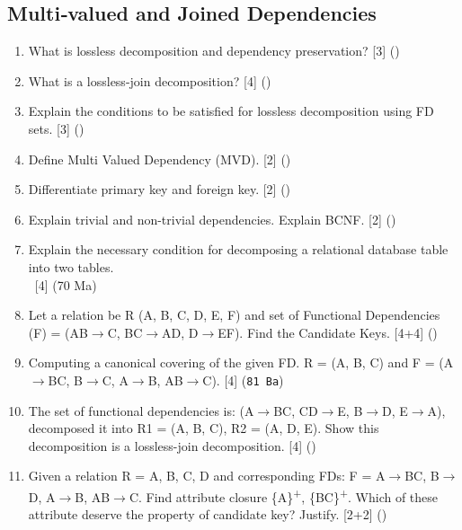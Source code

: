 \documentclass[12pt]{article}
\newcommand{\ra}{\rightarrow}
\newcommand{\enter}{\\\textcolor{white}{1}}
\newcommand{\super}[1]{\textsuperscript{#1}}
\begin{document}
    \subsection{Multi‐valued and Joined Dependencies}
    \begin{enumerate}[noitemsep, topsep = 0pt]
        \item What is lossless decomposition and dependency preservation? \hfill [3] ()

        \item What is a lossless-join decomposition? \hfill [4] ()

        \item Explain the conditions to be satisfied for lossless decomposition using FD sets. \hfill [3] ()
        
        \item Define Multi Valued Dependency (MVD). \hfill [2] ()
        
        \item Differentiate primary key and foreign key. \hfill [2] ()
        
        \item Explain trivial and non-trivial dependencies. Explain BCNF. \hfill [2] ()

        \item Explain the necessary condition for decomposing a relational database table into two tables.
        \enter\hfill [4] (70 Ma)

        \item Let a relation be R (A, B, C, D, E, F) and set of Functional Dependencies (F) = (AB$\ra$C, BC$\ra$AD, D$\ra$EF). Find the Candidate Keys. \hfill [4+4] ()
        
        \item Computing a canonical covering of the given FD. R = (A, B, C) and F = (A$\ra$BC, B$\ra$C, A$\ra$B, AB$\ra$C). \hfill [4] (\texttt{81 Ba})
        
        \item The set of functional dependencies is: (A$\ra$BC, CD$\ra$E, B$\ra$D, E$\ra$A), decomposed it into R1 = (A, B, C), R2 = (A, D, E). Show this decomposition is a lossless-join decomposition. \hfill [4] ()
        
        \item Given a relation R = {A, B, C, D} and corresponding FDs: F = {A$\ra$BC, B$\ra$D, A$\ra$B, AB$\ra$C}. Find attribute closure \{A\}\super{+}, \{BC\}\super{+}. Which of these attribute deserve the property of candidate key? Justify. \hfill [2+2] ()
        

\end{enumerate}
\end{document}

